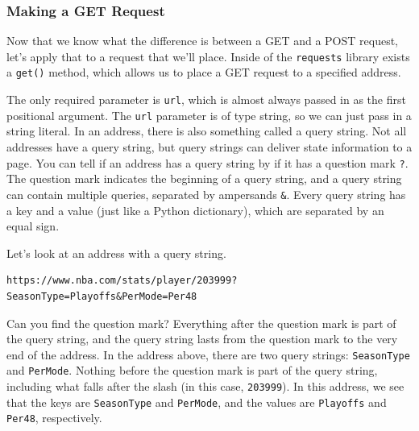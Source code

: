 \subsubsection{Making a GET Request}
Now that we know what the difference is between a GET and a POST request, let's apply that to a request that we'll place. Inside of the \verb|requests| library exists a \verb|get()| method, which allows us to place a GET request to a specified address.\par
The only required parameter is \verb|url|, which is almost always passed in as the first positional argument. The \verb|url| parameter is of type string, so we can just pass in a string literal. In an address, there is also something called a query string. Not all addresses have a query string, but query strings can deliver state information to a page. You can tell if an address has a query string by if it has a question mark \verb|?|. The question mark indicates the beginning of a query string, and a query string can contain multiple queries, separated by ampersands \verb|&|. Every query string has a key and a value (just like a Python dictionary), which are separated by an equal sign.\par
Let's look at an address with a query string.
\begin{lstlisting}[style=none]
https://www.nba.com/stats/player/203999?SeasonType=Playoffs&PerMode=Per48
\end{lstlisting}
Can you find the question mark? Everything after the question mark is part of the query string, and the query string lasts from the question mark to the very end of the address. In the address above, there are two query strings: \verb|SeasonType| and \verb|PerMode|. Nothing before the question mark is part of the query string, including what falls after the slash (in this case, \verb|203999|). In this address, we see that the keys are \verb|SeasonType| and \verb|PerMode|, and the values are \verb|Playoffs| and \verb|Per48|, respectively.\par
{}
